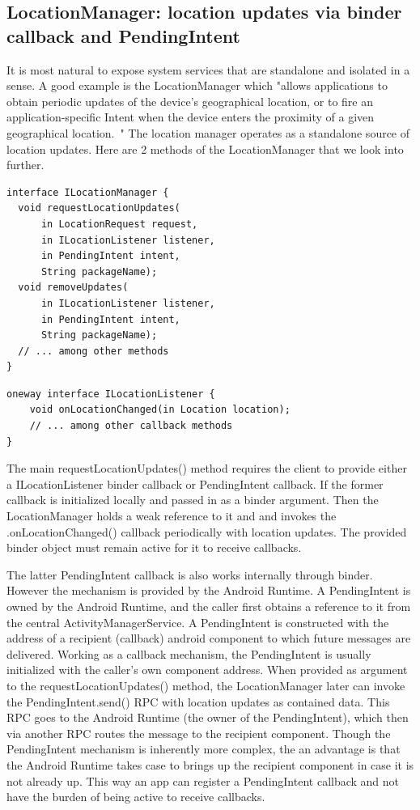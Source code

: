 \documentclass[prodmode]{acmlarge}
\begin{document}
\subsection{LocationManager: location updates via binder callback and PendingIntent}
It is most natural to expose system services that are standalone and isolated in a sense. A good example is the LocationManager which "allows applications to obtain periodic updates of the device's geographical location, or to fire an application-specific Intent when the device enters the proximity of a given geographical location.~\cite{LocationManagerDocs}" The location manager operates as a standalone source of location updates. Here are 2 methods of the LocationManager that we look into further.
\begin{Verbatim}[samepage=true]
interface ILocationManager {
  void requestLocationUpdates(
      in LocationRequest request,
      in ILocationListener listener,
      in PendingIntent intent,
      String packageName);
  void removeUpdates(
      in ILocationListener listener,
      in PendingIntent intent,
      String packageName);
  // ... among other methods
}
\end{Verbatim}

\begin{Verbatim}[samepage=true]
oneway interface ILocationListener {
    void onLocationChanged(in Location location);
    // ... among other callback methods
}
\end{Verbatim}

The main requestLocationUpdates() method requires the client to provide either a ILocationListener binder callback or PendingIntent callback. If the former callback is initialized locally and passed in as a binder argument. Then the LocationManager holds a weak reference to it and and invokes the .onLocationChanged() callback periodically with location updates. The provided binder object must remain active for it to receive callbacks.

The latter PendingIntent callback is also works internally through binder. However the mechanism is provided by the Android Runtime. A PendingIntent is owned by the Android Runtime, and the caller first obtains a reference to it from the central ActivityManagerService. A PendingIntent is constructed with the address of a recipient (callback) android component to which future messages are delivered. Working as a callback mechanism, the PendingIntent is usually initialized with the caller's own component address. When provided as argument to the requestLocationUpdates() method, the LocationManager later can invoke the PendingIntent.send() RPC with location updates as contained data. This RPC goes to the Android Runtime (the owner of the PendingIntent), which then via another RPC routes the message to the recipient component. Though the PendingIntent mechanism is inherently more complex, the an advantage is that the Android Runtime takes case to brings up the recipient component in case it is not already up. This way an app can register a PendingIntent callback and not have the burden of being active to receive callbacks.
\end{document}
